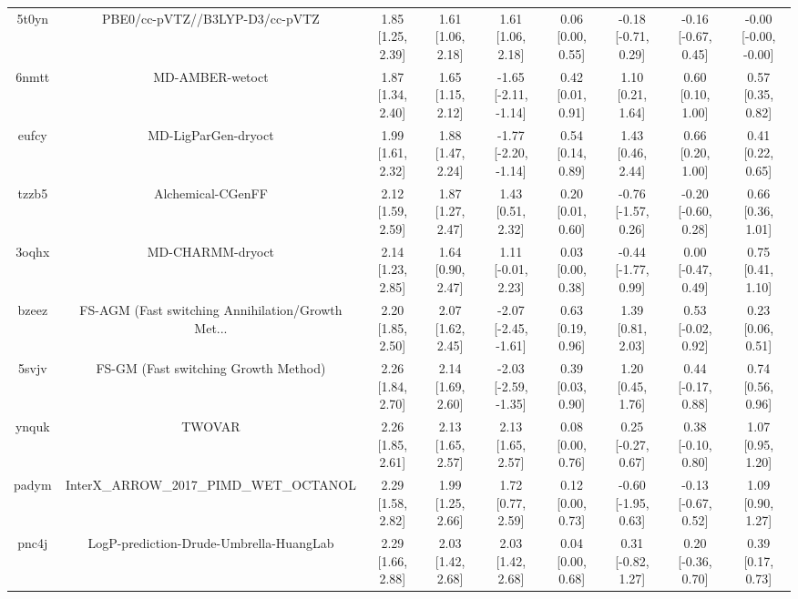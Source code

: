 \documentclass{article}
\begin{document}
\begin{center}
\begin{longtable}{|ccccccccc|}
 5t0yn &                     PBE0/cc-pVTZ//B3LYP-D3/cc-pVTZ &  1.85 [1.25, 2.39] &  1.61 [1.06, 2.18] &     1.61 [1.06, 2.18] &  0.06 [0.00, 0.55] &  -0.18 [-0.71, 0.29] &  -0.16 [-0.67, 0.45] &  -0.00 [-0.00, -0.00] \\
 6nmtt &                                    MD-AMBER-wetoct &  1.87 [1.34, 2.40] &  1.65 [1.15, 2.12] &  -1.65 [-2.11, -1.14] &  0.42 [0.01, 0.91] &    1.10 [0.21, 1.64] &    0.60 [0.10, 1.00] &     0.57 [0.35, 0.82] \\
 eufcy &                                MD-LigParGen-dryoct &  1.99 [1.61, 2.32] &  1.88 [1.47, 2.24] &  -1.77 [-2.20, -1.14] &  0.54 [0.14, 0.89] &    1.43 [0.46, 2.44] &    0.66 [0.20, 1.00] &     0.41 [0.22, 0.65] \\
 tzzb5 &                                  Alchemical-CGenFF &  2.12 [1.59, 2.59] &  1.87 [1.27, 2.47] &     1.43 [0.51, 2.32] &  0.20 [0.01, 0.60] &  -0.76 [-1.57, 0.26] &  -0.20 [-0.60, 0.28] &     0.66 [0.36, 1.01] \\
 3oqhx &                                   MD-CHARMM-dryoct &  2.14 [1.23, 2.85] &  1.64 [0.90, 2.47] &    1.11 [-0.01, 2.23] &  0.03 [0.00, 0.38] &  -0.44 [-1.77, 0.99] &   0.00 [-0.47, 0.49] &     0.75 [0.41, 1.10] \\
 bzeez &  FS-AGM (Fast switching Annihilation/Growth Met... &  2.20 [1.85, 2.50] &  2.07 [1.62, 2.45] &  -2.07 [-2.45, -1.61] &  0.63 [0.19, 0.96] &    1.39 [0.81, 2.03] &   0.53 [-0.02, 0.92] &     0.23 [0.06, 0.51] \\
 5svjv &               FS-GM (Fast switching Growth Method) &  2.26 [1.84, 2.70] &  2.14 [1.69, 2.60] &  -2.03 [-2.59, -1.35] &  0.39 [0.03, 0.90] &    1.20 [0.45, 1.76] &   0.44 [-0.17, 0.88] &     0.74 [0.56, 0.96] \\
 ynquk &                                             TWOVAR &  2.26 [1.85, 2.61] &  2.13 [1.65, 2.57] &     2.13 [1.65, 2.57] &  0.08 [0.00, 0.76] &   0.25 [-0.27, 0.67] &   0.38 [-0.10, 0.80] &     1.07 [0.95, 1.20] \\
 padym &            InterX\_ARROW\_2017\_PIMD\_WET\_OCTANOL &  2.29 [1.58, 2.82] &  1.99 [1.25, 2.66] &     1.72 [0.77, 2.59] &  0.12 [0.00, 0.73] &  -0.60 [-1.95, 0.63] &  -0.13 [-0.67, 0.52] &     1.09 [0.90, 1.27] \\
 pnc4j &            LogP-prediction-Drude-Umbrella-HuangLab &  2.29 [1.66, 2.88] &  2.03 [1.42, 2.68] &     2.03 [1.42, 2.68] &  0.04 [0.00, 0.68] &   0.31 [-0.82, 1.27] &   0.20 [-0.36, 0.70] &     0.39 [0.17, 0.73] \\

\end{longtable}
\end{center}
\end{document}
